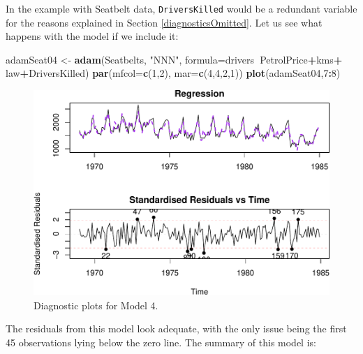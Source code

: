 \documentclass[]{book}
\newenvironment{Shaded}{\begin{snugshade}}{\end{snugshade}}
\newcommand{\DataTypeTok}[1]{\textcolor[rgb]{0.13,0.29,0.53}{#1}}
\newcommand{\DecValTok}[1]{\textcolor[rgb]{0.00,0.00,0.81}{#1}}
\newcommand{\KeywordTok}[1]{\textcolor[rgb]{0.13,0.29,0.53}{\textbf{#1}}}
\newcommand{\NormalTok}[1]{#1}
\newcommand{\OperatorTok}[1]{\textcolor[rgb]{0.81,0.36,0.00}{\textbf{#1}}}
\newcommand{\StringTok}[1]{\textcolor[rgb]{0.31,0.60,0.02}{#1}}
\theoremstyle{definition}
\theoremstyle{definition}
\theoremstyle{definition}
\theoremstyle{definition}
\theoremstyle{remark}
\begin{document}
In the example with Seatbelt data, \texttt{DriversKilled} would be a redundant variable for the reasons explained in Section \ref{diagnosticsOmitted}. Let us see what happens with the model if we include it:

\begin{Shaded}
\begin{Highlighting}[]
\NormalTok{adamSeat04 <-}\StringTok{ }\KeywordTok{adam}\NormalTok{(Seatbelts, }\StringTok{"NNN"}\NormalTok{, }
                   \DataTypeTok{formula=}\NormalTok{drivers}\OperatorTok{~}\NormalTok{PetrolPrice}\OperatorTok{+}\NormalTok{kms}\OperatorTok{+}
\StringTok{                     }\NormalTok{law}\OperatorTok{+}\NormalTok{DriversKilled)}
\KeywordTok{par}\NormalTok{(}\DataTypeTok{mfcol=}\KeywordTok{c}\NormalTok{(}\DecValTok{1}\NormalTok{,}\DecValTok{2}\NormalTok{), }\DataTypeTok{mar=}\KeywordTok{c}\NormalTok{(}\DecValTok{4}\NormalTok{,}\DecValTok{4}\NormalTok{,}\DecValTok{2}\NormalTok{,}\DecValTok{1}\NormalTok{))}
\KeywordTok{plot}\NormalTok{(adamSeat04,}\DecValTok{7}\OperatorTok{:}\DecValTok{8}\NormalTok{)}
\end{Highlighting}
\end{Shaded}

\begin{figure}
\centering
\includegraphics{Svetunkov--2022----ADAM_files/figure-latex/adamSeat04-1.pdf}
\caption{\label{fig:adamSeat04}Diagnostic plots for Model 4.}
\end{figure}

The residuals from this model look adequate, with the only issue being the first 45 observations lying below the zero line. The summary of this model is:
\end{document}
